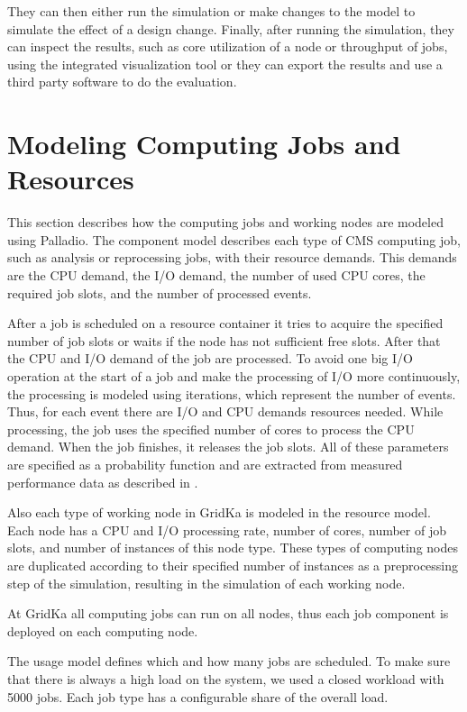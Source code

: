 \documentclass[runningheads,a4paper]{llncs}[2017/09/04]
\begin{document}
They can then either run the simulation or make changes to the model to simulate the effect of a design change. 
Finally, after running the simulation, they can inspect the results, such as core utilization of a node or throughput of jobs, using the integrated visualization tool or they can export the results and use a third party software to do the evaluation.


\section{Modeling Computing Jobs and Resources}
\label{sec:model}
This section describes how the computing jobs and working nodes are modeled using Palladio.
The component model describes each type of CMS computing job, such as analysis or reprocessing jobs, with their resource demands. This demands are the CPU demand, the I/O demand, the number of used CPU cores, the required job slots, and the number of processed events.

After a job is scheduled on a resource container it tries to acquire the specified number of job slots or waits if the node has not sufficient free slots. After that the CPU and I/O demand of the job are processed. To avoid one big I/O operation at the start of a job and make the processing of I/O more continuously, the processing is modeled using iterations, which represent the number of events. Thus, for each event there are I/O and CPU demands resources needed.
While processing, the job uses the specified number of cores to process the CPU demand. When the job finishes, it releases the job slots. All of these parameters are specified as a probability function and are extracted from measured performance data as described in .

Also each type of working node in GridKa is modeled in the resource model. Each node has a CPU and I/O processing rate, number of cores, number of job slots, and number of instances of this node type. These types of computing nodes are duplicated according to their specified number of instances as a preprocessing step of the simulation, resulting in the simulation of each working node.  

At GridKa all computing jobs can run on all nodes, thus each job component is deployed on each computing node.

The usage model defines which and how many jobs are scheduled. To make sure that there is always a high load on the system, we used a closed workload with 5000 jobs. Each job type has a configurable share of the overall load.
\end{document}
